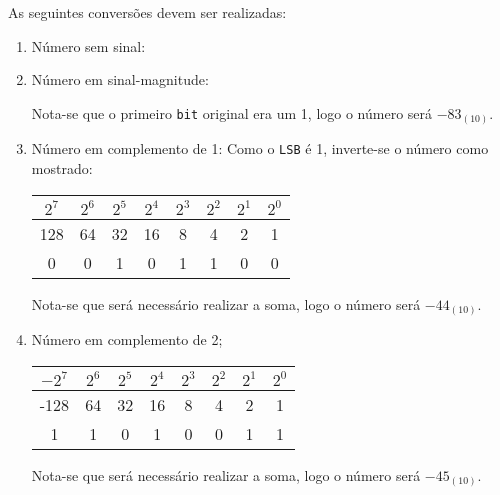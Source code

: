 \documentclass{article}
\begin{document}
            \begin{resolution}
                As seguintes conversões devem ser realizadas:
                \begin{enumerate}
                    \item Número sem sinal:
                        \begin{figure}[H]
                            \centering
                        \end{figure}

                    \item Número em sinal-magnitude:
                        \begin{figure}[H]
                            \centering
                        \end{figure}
                    Nota-se que o primeiro \texttt{bit} original era um 1, logo o número será $\boxed{-83_{(10)}}$.

                    \item Número em complemento de 1: Como o \texttt{LSB} é 1, inverte-se o número como mostrado:
                        \begin{table}[H]
                            \centering  
                            \begin{tabular}[]{cc cc cc cc}
                                $2^7$ & $2^6$ & $2^5$ & $2^4$ & $2^3$ & $2^2$ & $2^1$ & $2^0$\\\hline
                                128   & 64    & 32    & 16    & 8     & 4     & 2     & 1\\
                                  0   &  0    &  1    &  0    & 1     & 1     & 0     & 0\\
                            \end{tabular}
                        \end{table}
                    Nota-se que será necessário realizar a soma, logo o número será $\boxed{-44_{(10)}}$.

                    \item Número em complemento de 2;
                        \begin{table}[H]
                            \centering  
                            \begin{tabular}[]{cc cc cc cc}
                                $-2^7$ & $2^6$ & $2^5$ & $2^4$ & $2^3$ & $2^2$ & $2^1$ & $2^0$\\\hline
                                -128   & 64    & 32    & 16    & 8     & 4     & 2     & 1\\
                                   1   &  1    &  0    &  1    & 0     & 0     & 1     & 1\\
                            \end{tabular}
                        \end{table}
                    Nota-se que será necessário realizar a soma, logo o número será $\boxed{-45_{(10)}}$.
                \end{enumerate}
            \end{resolution}
\end{document}
